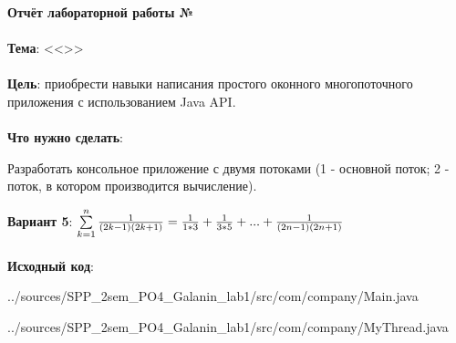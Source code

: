 \documentclass[12pt, a4paper, simple]{eskdtext}
\def \gpiDocTopic {Отчёт лабораторной работы №\gpiDocNum}
\begin{document}
    
    \begin{center}
        \textbf{\gpiDocTopic}
    \end{center}

    \paragraph{} \textbf{Тема}: <<\gpiTopicRep>>

    \paragraph{} \textbf{Цель}:
    приобрести навыки написания простого оконного многопоточного приложения с использованием Java API.

    \paragraph{} \textbf{Что нужно сделать}:

    Разработать консольное приложение с двумя потоками (1 - основной поток; 2 - поток, в котором производится вычисление).

    \textbf{Вариант 5}:
    $\sum\limits_{k=1}^n {1 \over (2k-1) (2k + 1)} = {1 \over 1 * 3} + {1 \over 3 * 5} + ... + {1 \over (2n-1) (2n + 1)}$



    \paragraph{} \textbf{Исходный код}: 

    
    {../sources/SPP_2sem_PO4_Galanin_lab1/src/com/company/Main.java}

    
    {../sources/SPP_2sem_PO4_Galanin_lab1/src/com/company/MyThread.java}
\end{document}
